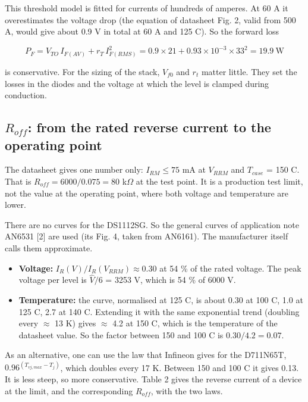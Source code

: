 \documentclass[11pt,a4paper,numbers=noenddot]{scrartcl}
\providecommand{\tightlist}{\setlength{\itemsep}{0pt}\setlength{\parskip}{0pt}}
\begin{document}
\begin{onehalfspace}
This threshold model is fitted for currents of hundreds of amperes. At 60 A it overestimates the voltage drop (the equation of datasheet Fig. 2, valid from 500 A, would give about 0.9 V in total at 60 A and 125 \textdegree{}C). So the forward loss

\[P_F = V_{TO}\, I_{F(AV)} + r_T\, I_{F(RMS)}^2 = 0.9 \times 21 + 0.93 \times 10^{-3} \times 33^2 = 19.9\ \text{W}\]

is conservative. For the sizing of the stack, \(V_{f0}\) and \(r_t\) matter little. They set the losses in the diodes and the voltage at which the level is clamped during conduction.

\subsection{\texorpdfstring{\(R_{off}\): from the rated reverse current to the operating point}{R\_\{off\}: from the rated reverse current to the operating point}}\label{r_off-from-the-rated-reverse-current-to-the-operating-point}

The datasheet gives one number only: \(I_{RM} \le 75\) mA at \(V_{RRM}\) and \(T_{case}\) = 150 \textdegree{}C. That is \(R_{off} = 6000/0.075 = 80\) k\(\Omega\) at the test point. It is a production test limit, not the value at the operating point, where both voltage and temperature are lower.

There are no curves for the DS1112SG. So the general curves of application note AN6531 {[}2{]} are used (its Fig. 4, taken from AN6161). The manufacturer itself calls them approximate.

\begin{itemize}
\tightlist
\item
  \textbf{Voltage:} \(I_R(V)/I_R(V_{RRM}) \approx 0.30\) at 54 \% of the rated voltage. The peak voltage per level is \(\hat V/6\) = 3253 V, which is 54 \% of 6000 V.
\item
  \textbf{Temperature:} the curve, normalised at 125 \textdegree{}C, is about 0.30 at 100 \textdegree{}C, 1.0 at 125 \textdegree{}C, 2.7 at 140 \textdegree{}C. Extending it with the same exponential trend (doubling every \(\approx\) 13 K) gives \(\approx\) 4.2 at 150 \textdegree{}C, which is the temperature of the datasheet value. So the factor between 150 and 100 \textdegree{}C is \(0.30/4.2 = 0.07\).
\end{itemize}

As an alternative, one can use the law that Infineon gives for the D711N65T, \(0.96^{(T_{vj,max} - T_j)}\), which doubles every 17 K. Between 150 and 100 \textdegree{}C it gives 0.13. It is less steep, so more conservative. Table 2 gives the reverse current of a device at the limit, and the corresponding \(R_{off}\), with the two laws.


\end{onehalfspace}
\end{document}
